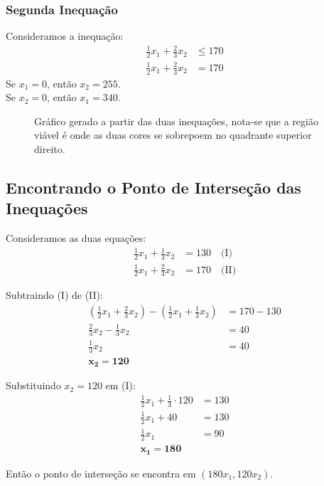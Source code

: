 \documentclass{article}
\begin{document}
\subsubsection{Segunda Inequação}

Consideramos a inequação:
\begin{align}
    \frac{1}{2}x_1 + \frac{2}{3}x_2 &\leq 170 \\
    \frac{1}{2}x_1 + \frac{2}{3}x_2 &= 170
\end{align}
Se $x_1 = 0$, então $x_2 = 255$. \\
Se $x_2 = 0$, então $x_1 = 340$.

\begin{figure}[h]
    \centering
    
    \caption{Gráfico gerado a partir das duas inequações, nota-se que a região viável é onde as duas cores se sobrepoem no quadrante superior direito.}
\end{figure}

\subsection{Encontrando o Ponto de Interseção das Inequações}

Consideramos as duas equações:
\begin{align}
    \frac{1}{2}x_1 + \frac{1}{3}x_2 &= 130 \quad \text{(I)} \\
    \frac{1}{2}x_1 + \frac{2}{3}x_2 &= 170 \quad \text{(II)}
\end{align}

Subtraindo (I) de (II):
\begin{align}
    \left(\frac{1}{2}x_1 + \frac{2}{3}x_2\right) - \left(\frac{1}{2}x_1 + \frac{1}{3}x_2\right) &= 170 - 130 \\
    \frac{2}{3}x_2 - \frac{1}{3}x_2 &= 40 \\
    \frac{1}{3}x_2 &= 40 \\
    \mathbf{x_2 = 120}
\end{align}

Substituindo $x_2 = 120$ em (I):
\begin{align}
    \frac{1}{2}x_1 + \frac{1}{3} \cdot 120 &= 130 \\
    \frac{1}{2}x_1 + 40 &= 130 \\
    \frac{1}{2}x_1 &= 90 \\
    \mathbf{x_1 = 180}
\end{align}

Então o ponto de interseção se encontra em $(180x_1,120x_2)$.
\end{document}

